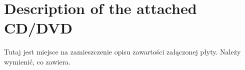 \chapter{Description of the attached CD/DVD}
Tutaj jest miejsce na zamieszczenie opisu zawartości załączonej płyty.
Należy wymienić, co zawiera.
